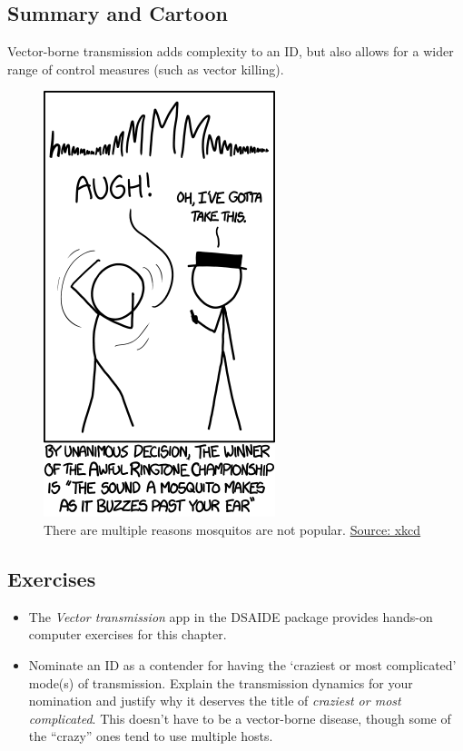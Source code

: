\documentclass[]{article}
\providecommand{\tightlist}{%
  \setlength{\itemsep}{0pt}\setlength{\parskip}{0pt}}
\theoremstyle{definition}
\theoremstyle{definition}
\theoremstyle{definition}
\theoremstyle{remark}
\begin{document}
\subsection{Summary and Cartoon}\label{summary-and-cartoon-7}

Vector-borne transmission adds complexity to an ID, but also allows for
a wider range of control measures (such as vector killing).

\begin{figure}
\centering
\includegraphics{./images/xkcd-mosquito-ringtone.png}
\caption{There are multiple reasons mosquitos are not popular.
\href{https://xkcd.com/1241/}{Source: xkcd}}
\end{figure}

\subsection{Exercises}\label{exercises-7}

\begin{itemize}
\tightlist
\item
  The \emph{Vector transmission} app in the DSAIDE package provides
  hands-on computer exercises for this chapter.
\item
  Nominate an ID as a contender for having the `craziest or most
  complicated' mode(s) of transmission. Explain the transmission
  dynamics for your nomination and justify why it deserves the title of
  \emph{craziest or most complicated}. This doesn't have to be a
  vector-borne disease, though some of the ``crazy'' ones tend to use
  multiple hosts.
\end{itemize}
\end{document}
